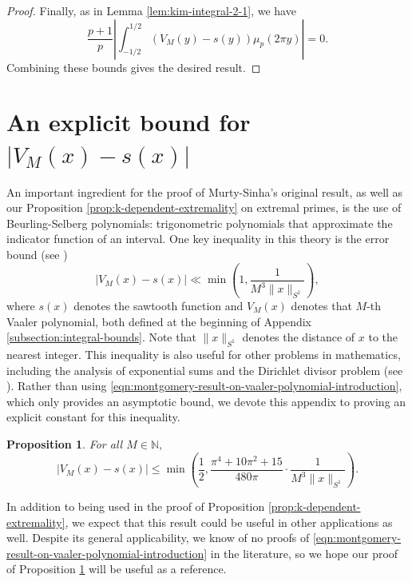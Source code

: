 \documentclass[11pt,letterpaper,reqno]{amsart}
\newtheorem{proposition}[theorem]{Proposition}
\theoremstyle{definition}
\numberwithin{equation}{section}
\numberwithin{figure}{section}
\numberwithin{table}{section}
\begin{document}
\begin{proof}
Finally, as in Lemma \ref{lem:kim-integral-2-1}, we have
$$\frac{p + 1}{p}\left| \int_{-1/2}^{1/2}
 \left( V_M(y) - s(y) \right) \mu_p(2\pi y) \right| = 0.$$
 Combining these bounds gives the desired result.
\end{proof}


\section{An explicit bound for \texorpdfstring{$ \left| V_M(x) - s(x) \right|$}{|VM(x)s(x)|}}\label{appendix:Vaaler}

An important ingredient for the proof of Murty-Sinha's original result, as well as our Proposition \ref{prop:k-dependent-extremality} on extremal primes, is the use of Beurling-Selberg polynomials: trigonometric polynomials that approximate the indicator function of an interval. One key inequality in this theory is the error bound (see \cite[$\S$1, (19)]{Mon94})
\begin{equation}\label{eqn:montgomery-result-on-vaaler-polynomial-introduction}
    \left| V_M(x) - s(x) \right| \ll \min\left( 1,  \frac{1}{M^3 \lVert x \rVert_{S^1}}  \right),
\end{equation}
where $s(x)$ denotes the sawtooth function and $V_M(x)$ denotes that $M$-th Vaaler polynomial, both defined at the beginning of Appendix \ref{subsection:integral-bounds}. Note that $\lVert x \rVert_{S^1}$ denotes the distance of $x$ to the nearest integer. This inequality is also useful for other problems in mathematics, including the analysis of exponential sums and the Dirichlet divisor problem (see \cite{huxley2003exponential}). Rather than using \eqref{eqn:montgomery-result-on-vaaler-polynomial-introduction}, which only provides an asymptotic bound, we devote this appendix to proving an explicit constant for this inequality.

\begin{proposition}\label{prop:explicit-constant-vaaler-bound}
    For all $M \in \mathbb{N},$
    $$\left| V_M(x) - s(x) \right| \leq \min\left( \frac{1}{2},  \frac{\pi^4 + 10 \pi^2 + 15}{480\pi} \cdot \frac{1}{M^3 \lVert x \rVert_{S^1}}  \right).$$
\end{proposition}

In addition to being used in the proof of Proposition \ref{prop:k-dependent-extremality}, we expect that this result could be useful in other applications as well. Despite its general applicability, we know of no proofs 
of \eqref{eqn:montgomery-result-on-vaaler-polynomial-introduction} in the literature, so we hope our proof of Proposition \ref{prop:explicit-constant-vaaler-bound} will be useful as a reference. 
\end{document}
